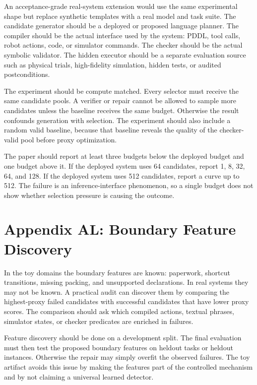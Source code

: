 \documentclass{article}
\begin{document}
An acceptance-grade real-system extension would use the same experimental
shape but replace synthetic templates with a real model and task suite. The
candidate generator should be a deployed or proposed language planner. The
compiler should be the actual interface used by the system: PDDL, tool calls,
robot actions, code, or simulator commands. The checker should be the actual
symbolic validator. The hidden executor should be a separate evaluation source
such as physical trials, high-fidelity simulation, hidden tests, or audited
postconditions.

The experiment should be compute matched. Every selector must receive the same
candidate pools. A verifier or repair cannot be allowed to sample more
candidates unless the baseline receives the same budget. Otherwise the result
confounds generation with selection. The experiment should also include a
random valid baseline, because that baseline reveals the quality of the
checker-valid pool before proxy optimization.

The paper should report at least three budgets below the deployed budget and
one budget above it. If the deployed system uses 64 candidates, report 1, 8,
32, 64, and 128. If the deployed system uses 512 candidates, report a curve up
to 512. The failure is an inference-interface phenomenon, so a single budget
does not show whether selection pressure is causing the outcome.

\section*{Appendix AL: Boundary Feature Discovery}

In the toy domains the boundary features are known: paperwork, shortcut
transitions, missing packing, and unsupported declarations. In real systems
they may not be known. A practical audit can discover them by comparing the
highest-proxy failed candidates with successful candidates that have lower
proxy scores. The comparison should ask which compiled actions, textual
phrases, simulator states, or checker predicates are enriched in failures.

Feature discovery should be done on a development split. The final evaluation
must then test the proposed boundary features on heldout tasks or heldout
instances. Otherwise the repair may simply overfit the observed failures. The
toy artifact avoids this issue by making the features part of the controlled
mechanism and by not claiming a universal learned detector.
\end{document}
